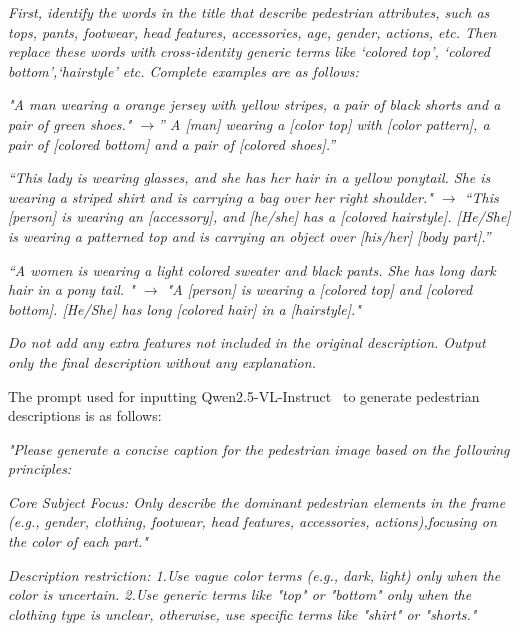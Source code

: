 \emph{\color{black!65} First, identify the words in the title that describe pedestrian attributes, such as tops, pants, footwear, head features, accessories, age, gender, actions, etc. Then replace these words with cross-identity generic terms like ‘colored top’, ‘colored bottom’,‘hairstyle’ etc. Complete examples are as follows:}

\emph{\color{black!65}"A man wearing a orange jersey with yellow stripes, a pair of black shorts and a pair of green shoes." $\rightarrow$” A [man] wearing a [color top] with [color pattern], a pair of [colored bottom] and a pair of [colored shoes].” }

\emph{\color{black!65}“This lady is wearing glasses, and she has her hair in a yellow ponytail. She is wearing a striped shirt and is carrying a bag over her right shoulder." $\rightarrow$ “This [person] is wearing an [accessory], and [he/she] has a [colored hairstyle]. [He/She] is wearing a patterned top and is carrying an object over [his/her] [body part].”}

\emph{\color{black!65}“A women is wearing a light colored sweater and black pants. She has long dark hair in a pony tail. " $\rightarrow$ "A [person] is wearing a [colored top] and [colored bottom]. [He/She] has long [colored hair] in a [hairstyle]."}

\emph{\color{black!65}Do not add any extra features not included in the original description. Output only the final description without any explanation.}



The prompt used for inputting Qwen2.5-VL-Instruct~\cite{bai2025qwen2} to generate pedestrian descriptions is as follows:



\emph{\color{black!65}"Please generate a concise caption for the pedestrian image based on the following principles:}

\emph{\color{black!65}Core Subject Focus: Only describe the dominant pedestrian elements in the frame (e.g., gender, clothing, footwear, head features, accessories, actions),focusing on the color of each part."}

\emph{\color{black!65}Description restriction: 1.Use vague color terms (e.g., dark, light) only when the color is uncertain. 2.Use generic terms like "top" or "bottom" only when the clothing type is unclear, otherwise, use specific terms like "shirt" or "shorts."}

